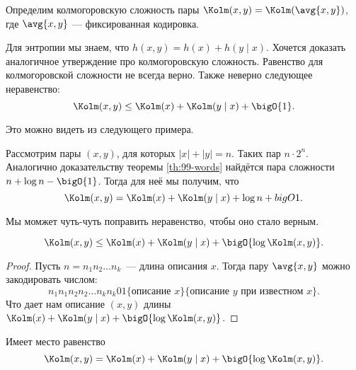 \begin{definition}
    Определим колмогоровскую сложность пары $\Kolm(x, y) = \Kolm(\avg{x, y})$, где $\avg{x, y}$ ---
    фиксированная кодировка.
\end{definition}

Для энтропии мы знаем, что $h(x, y) = h(x) + h(y \mid x)$. Хочется доказать аналогичное утверждение про
колмогоровскую сложность. Равенство для колмогоровской сложности не всегда верно. Также неверно следующее
неравенство:  
$$
    \Kolm(x, y) \le \Kolm(x) + \Kolm(y \mid x) + \bigO{1}.
$$
    
Это можно видеть из следующего примера.
\begin{example}
    Рассмотрим пары $(x, y)$, для которых $|x| + |y| = n$. Таких пар $n \cdot 2^n$. Аналогично
    доказательству теоремы \ref{th:99-words} найдётся пара сложности $n + \log n - \bigO{1}$. Тогда для
    неё мы получим, что  
    $$
        \Kolm(x, y) = \Kolm(x) + \Kolm(y \mid x) + \log n + bigO{1}.
    $$
\end{example}

Мы момжет чуть-чуть поправить неравенство, чтобы оно стало верным.
\begin{theorem}
    $$
        \Kolm(x, y) \le \Kolm(x) + \Kolm(y \mid x) + \bigO{\log \Kolm(x, y)}.
    $$
\end{theorem}

\begin{proof}
    Пусть $n = n_1n_2\ldots n_k$~--- длина описания $x$. Тогда пару $\avg{x, y}$ можно закодировать
    числом:
    $$
        n_1n_1n_2n_2 \ldots n_kn_k01\{\text{описание } x\}\{\text{описание } y \text{ при известном $x$}\}.
    $$
    Что дает нам описание $(x, y)$ длины $\Kolm(x) + \Kolm(y \mid x) + \bigO{\log \Kolm(x, y)}$.
\end{proof}

\begin{theorem}
    Имеет место равенство 
    $$
        \Kolm(x, y) = \Kolm(x) + \Kolm(y \mid x) + \bigO{\log \Kolm(x, y)}.
    $$
\end{theorem}

